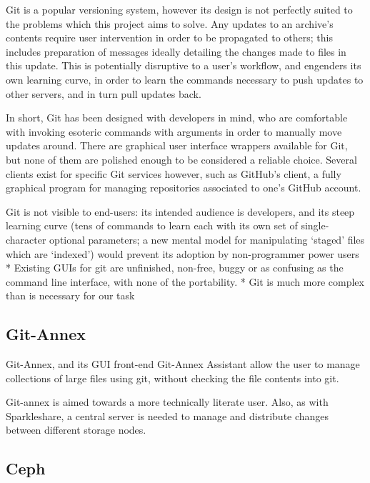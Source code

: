 \documentclass[12pt,a4paper,]{adreport}
\begin{document}
Git is a popular versioning system, however its design is not perfectly
suited to the problems which this project aims to solve. Any updates to
an archive's contents require user intervention in order to be
propagated to others; this includes preparation of messages ideally
detailing the changes made to files in this update. This is potentially
disruptive to a user's workflow, and engenders its own learning curve,
in order to learn the commands necessary to push updates to other
servers, and in turn pull updates back.

In short, Git has been designed with developers in mind, who are
comfortable with invoking esoteric commands with arguments in order to
manually move updates around. There are graphical user interface
wrappers available for Git, but none of them are polished enough to be
considered a reliable choice. Several clients exist for specific Git
services however, such as GitHub's client, a fully graphical program for
managing repositories associated to one's GitHub account.

Git is not visible to end-users: its intended audience is developers,
and its steep learning curve (tens of commands to learn each with its
own set of single-character optional parameters; a new mental model for
manipulating `staged' files which are `indexed') would prevent its
adoption by non-programmer power users * Existing GUIs for git are
unfinished, non-free, buggy or as confusing as the command line
interface, with none of the portability. * Git is much more complex than
is necessary for our task

\subsection{Git-Annex}\label{git-annex}

Git-Annex, and its GUI front-end Git-Annex Assistant allow the user to
manage collections of large files using git, without checking the file
contents into git.\cite{Joey Hess, ``Git Annex''
  (http://git-annex.branchable.com/) (Accessed 25/06/2014)}

Git-annex is aimed towards a more technically literate user. Also, as
with Sparkleshare, a central server is needed to manage and distribute
changes between different storage nodes.

\subsection{Ceph}\label{ceph}
\end{document}
